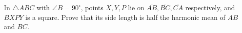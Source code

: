 In $\triangle ABC$ with $\angle B=90^\circ$, points $X,Y,P$ lie on $\overline{AB},\overline{BC},\overline{CA}$ respectively, and $BXPY$ is a square. Prove that its side length is half the harmonic mean of $AB$ and $BC$.
